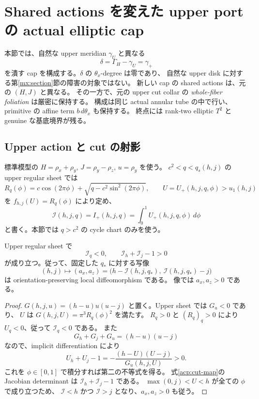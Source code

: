 \section{Shared actions を変えた upper port の actual elliptic cap}
\label{acp:section}

本節では、自然な upper meridian $\gamma_U$ と異なる
\[
 \delta=\Gamma_H-\gamma_U=\gamma_+
\]
を潰す cap を構成する。$\delta$ の $\theta_x$-degree は零であり、
自然な upper disk に対する第\ref{mx:section}節の障害の対象ではない。
新しい cap の shared actions は、元の $(H,J)$ と異なる。
その一方で、元の upper cut collar の \emph{whole-fiber foliation} は厳密に保持する。
構成は同じ actual annular tube の中で行い、primitive の affine term $b\,d\theta_x$ も保持する。
終点には rank-two elliptic $T^2$ と genuine な基底境界が残る。

\subsection{Upper action と cut の射影}

標準模型の $H=\rho_x+\rho_y$, $J=\rho_y-\rho_z$, $u=\rho_y$ を使う。
$c^2<q<q_s(h,j)$ の upper regular sheet では
\[
 R_q(\phi)=c\cos(2\pi\phi)+\sqrt{q-c^2\sin^2(2\pi\phi)},
 \qquad U=U_+(h,j,q,\phi)>u_1(h,j)
\]
を $f_{h,j}(U)=R_q(\phi)$ により定め、
\[
 \mathcal I(h,j,q)=I_+(h,j,q)=\int_0^1U_+(h,j,q,\phi)\,d\phi
\]
と書く。本節では $q>c^2$ の cycle chart のみを使う。

\begin{lemma}\label{acp:projection}
Upper regular sheet で
\begin{equation}\label{acp:derivatives}
 \mathcal I_q<0,\qquad \mathcal I_h+\mathcal I_j-1>0
\end{equation}
が成り立つ。従って、固定した $q_*$ に対する写像
\begin{equation}\label{acp:cut-map}
 (h,j)\longmapsto
 (a_x,a_z)=\bigl(h-\mathcal I(h,j,q_*),\ \mathcal I(h,j,q_*)-j\bigr)
\end{equation}
は orientation-preserving local diffeomorphism である。
像では $a_x,a_z>0$ である。
\end{lemma}

\begin{proof}
$G(h,j,u)=(h-u)u(u-j)$ と置く。Upper sheet では $G_u<0$ であり、
$U$ は $G(h,j,U)=\pi^3R_q(\phi)^2$ を満たす。
$R_q>0$ と $(R_q)_q>0$ により $U_q<0$、従って $\mathcal I_q<0$ である。
また
\[
 G_h+G_j+G_u=(h-u)(u-j)
\]
なので、implicit differentiation により
\[
 U_h+U_j-1=-\frac{(h-U)(U-j)}{G_u(h,j,U)}>0.
\]
これを $\phi\in[0,1]$ で積分すれば第二の不等式を得る。
式\eqref{acp:cut-map}の Jacobian determinant は
$\mathcal I_h+\mathcal I_j-1$ である。
$\max(0,j)<U<h$ が全ての $\phi$ で成り立つため、
$\mathcal I<h$ かつ $\mathcal I>j$ となり、$a_x,a_z>0$ も従う。
\end{proof}

